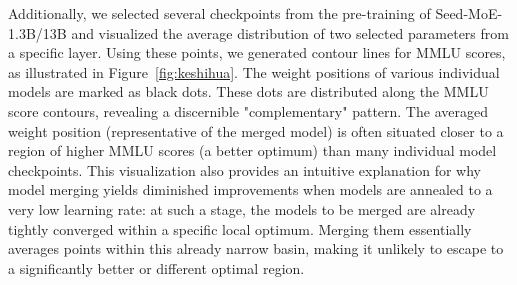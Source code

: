Additionally, we selected several checkpoints from the pre-training of Seed-MoE-1.3B/13B and visualized the average distribution of two selected parameters from a specific layer. Using these points, we generated contour lines for MMLU scores, as illustrated in Figure~\ref{fig:keshihua}. The weight positions of various individual models are marked as black dots. These dots are distributed along the MMLU score contours, revealing a discernible "complementary" pattern. The averaged weight position (representative of the merged model) is often situated closer to a region of higher MMLU scores (a better optimum) than many individual model checkpoints. This visualization also provides an intuitive explanation for why model merging yields diminished improvements when models are annealed to a very low learning rate: at such a stage, the models to be merged are already tightly converged within a specific local optimum. Merging them essentially averages points within this already narrow basin, making it unlikely to escape to a significantly better or different optimal region.
